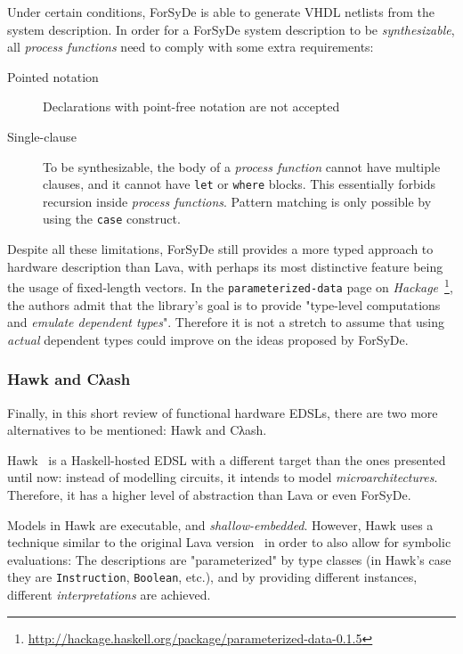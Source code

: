             Under certain conditions, ForSyDe is able to generate \ac{VHDL} netlists from the system description.
            In order for a ForSyDe system description to be \emph{synthesizable},
            all \emph{process functions} need to comply with some extra requirements:

            \begin{description}
                \item[Pointed notation] Declarations with point-free notation are not accepted
                \item[Single-clause] To be synthesizable,
                    the body of a \emph{process function} cannot have multiple clauses,
                    and it cannot have \texttt{let} or \texttt{where} blocks.
                    This essentially forbids recursion inside \emph{process functions}.
                    Pattern matching is only possible by using the \texttt{case} construct.
            \end{description}

            Despite all these limitations,
            ForSyDe still provides a more typed approach to hardware description than Lava,
            with perhaps its most distinctive feature being the usage of fixed-length vectors.
            In the \texttt{parameterized-data} page on
            \emph{Hackage}~\footnote{\url{http://hackage.haskell.org/package/parameterized-data-0.1.5}},
            the authors admit that the library's goal is to provide
            "type-level computations and \emph{emulate dependent types}".
            Therefore it is not a stretch to assume that using \emph{actual} dependent types
            could improve on the ideas proposed by ForSyDe.


            \subsubsection{Hawk and Cλash}
            Finally, in this short review of functional hardware \acp{EDSL},
            there are two more alternatives to be mentioned: Hawk and Cλash.

            Hawk~\cite{hawk-haskell} is a Haskell-hosted \ac{EDSL} with a different target than
            the ones presented until now: instead of modelling circuits, it intends to model \emph{microarchitectures}.
            Therefore, it has a higher level of abstraction than Lava or even ForSyDe.

            Models in Hawk are executable, and \emph{shallow-embedded}.
            However, Hawk uses a technique similar to the original Lava version~\cite{lava-1999}
            in order to also allow for symbolic evaluations:
            The descriptions are "parameterized" by type classes
            (in Hawk's case they are \texttt{Instruction}, \texttt{Boolean}, etc.),
            and by providing different instances, different \emph{interpretations} are achieved.

